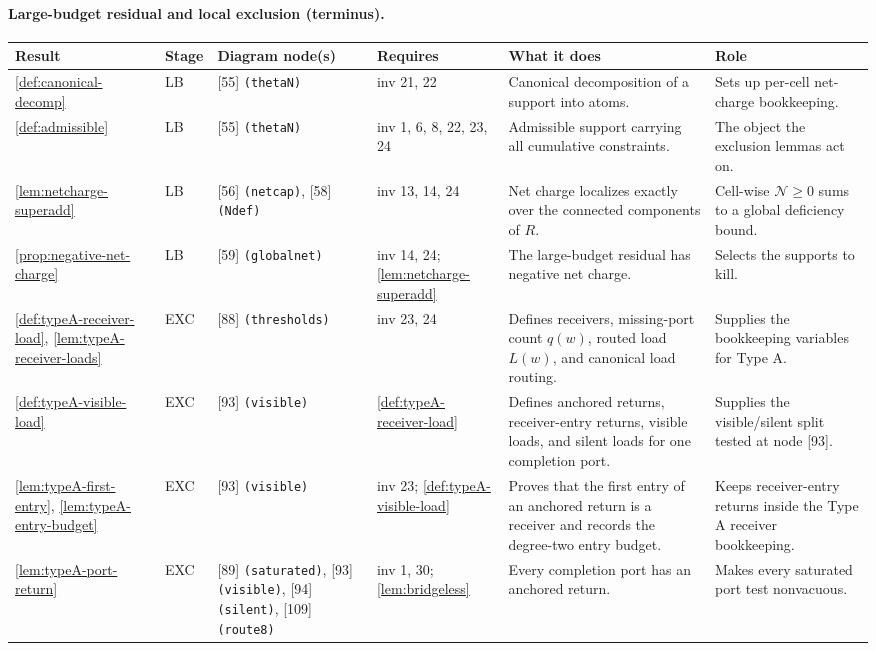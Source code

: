 \documentclass[11pt]{article}
\newcommand{\No}{\mathcal N}
\begin{document}
\paragraph{Large-budget residual and local exclusion (terminus).}
{\scriptsize\setlength{\tabcolsep}{3pt}
\begin{longtable}{L{0.10\textwidth} C{0.045\textwidth} L{0.13\textwidth} L{0.135\textwidth} L{0.28\textwidth} L{0.20\textwidth}}
\toprule
\textbf{Result} & \textbf{Stage} & \textbf{Diagram node(s)} & \textbf{Requires} & \textbf{What it does} & \textbf{Role} \\
\midrule
\endhead
\cref{def:canonical-decomp} & LB & [55] \texttt{(thetaN)} & inv 21, 22 & Canonical decomposition of a support into atoms. & Sets up per-cell net-charge bookkeeping. \\
\cref{def:admissible} & LB & [55] \texttt{(thetaN)} & inv 1, 6, 8, 22, 23, 24 & Admissible support carrying all cumulative constraints. & The object the exclusion lemmas act on. \\
\cref{lem:netcharge-superadd} & LB & [56] \texttt{(netcap)}, [58] \texttt{(Ndef)} & inv 13, 14, 24 & Net charge localizes exactly over the connected components of $R$. & Cell-wise $\No\ge0$ sums to a global deficiency bound. \\
\cref{prop:negative-net-charge} & LB & [59] \texttt{(globalnet)} & inv 14, 24; \cref{lem:netcharge-superadd} & The large-budget residual has negative net charge. & Selects the supports to kill. \\
\cref{def:typeA-receiver-load}, \cref{lem:typeA-receiver-loads} & EXC & [88] \texttt{(thresholds)} & inv 23, 24 & Defines receivers, missing-port count $q(w)$, routed load $L(w)$, and canonical load routing. & Supplies the bookkeeping variables for Type A. \\
\cref{def:typeA-visible-load} & EXC & [93] \texttt{(visible)} & \cref{def:typeA-receiver-load} & Defines anchored returns, receiver-entry returns, visible loads, and silent loads for one completion port. & Supplies the visible/silent split tested at node [93]. \\
\cref{lem:typeA-first-entry}, \cref{lem:typeA-entry-budget} & EXC & [93] \texttt{(visible)} & inv 23; \cref{def:typeA-visible-load} & Proves that the first entry of an anchored return is a receiver and records the degree-two entry budget. & Keeps receiver-entry returns inside the Type A receiver bookkeeping. \\
\cref{lem:typeA-port-return} & EXC & [89] \texttt{(saturated)}, [93] \texttt{(visible)}, [94] \texttt{(silent)}, [109] \texttt{(route8)} & inv 1, 30; \cref{lem:bridgeless} & Every completion port has an anchored return. & Makes every saturated port test nonvacuous. \\

\end{longtable}}
\end{document}
